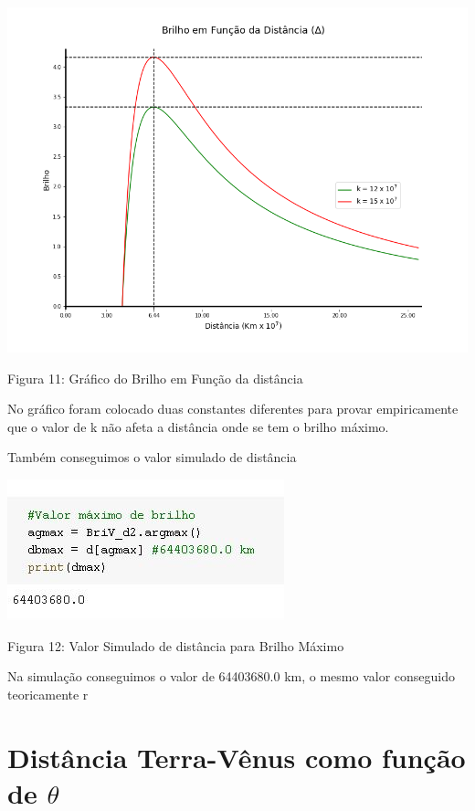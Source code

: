 \documentclass[a4paper, 12pt]{article}
\begin{document}
\begin{center}
    \includegraphics[width=16cm]{11-Brilho_Distancia.png}
    
    Figura 11: Gráfico do Brilho em Função da distância
\end{center}
 
 No gráfico foram colocado duas constantes diferentes para provar empiricamente que o valor de k não afeta a distância onde se tem o brilho máximo.
 
 Também conseguimos o valor simulado de distância 
 
 \begin{center}
    \includegraphics{12-vmax.JPG}
    
    Figura 12: Valor Simulado de distância para Brilho Máximo
\end{center}
  
Na simulação conseguimos o valor de 64403680.0 km, o mesmo valor conseguido teoricamente
r

\section{Distância Terra-Vênus como função de $\theta $}
\end{document}
